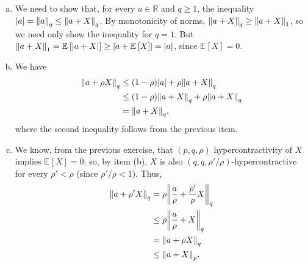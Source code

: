 \documentclass[12pt]{article}
\newcommand{\E}[2][]{\mathbb E_{#1}\left[#2\right]}
\newcommand{\R}{\mathbb R}
\begin{document}
\subsection{}
\begin{enumerate}[(a)]
    \item We need to show that, for every $a \in \R$ and $q \geq 1$, the inequality $\abs{a} = \norm{a}_q \leq \norm{a + X}_q$. By monotonicity of norms, $\norm{a + X}_q \geq \norm{a + X}_1$, so we need only show the inequality for $q = 1$. But $\norm{a + X}_1 = \E{\abs{a + X}} \geq \abs{a + \E{X}} = \abs{a}$, since $\E{X} = 0$.
    
    \item We have
    \begin{align*}
        \norm{a + \rho X}_q &\leq (1 - \rho) \abs{a} + \rho \norm{a + X}_q\\
        &\leq (1 - \rho) \norm{a + X}_q + \rho \norm{a + X}_q\\
        &= \norm{a + X}_q,
    \end{align*}
    where the second inequality follows from the previous item.
    
    \item We know, from the previous exercise, that $(p, q, \rho)$ hypercontractivity of $X$ implies $\E{X} = 0$; so, by item (b), $X$ is also $(q,q,\rho'/\rho)$-hypercontractive for every $\rho' < \rho$ (since $\rho'/\rho < 1$). Thus,
    \begin{align*}
        \norm{a + \rho' X}_q &= \rho \norm{\frac{a}{\rho} + \frac{\rho'}{\rho} X}_q\\
        &\leq \rho \norm{\frac{a}{\rho} + X}_q\\
        &= \norm{a + \rho X}_q\\
        &\leq \norm{a + X}_p.
    \end{align*}
\end{enumerate}
\end{document}
